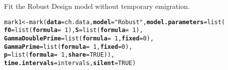 \documentclass[color=usenames,dvipsnames]{beamer}\usepackage[]{graphicx}\usepackage[]{xcolor}
\makeatletter
\newcommand{\hlnum}[1]{\textcolor[rgb]{0.69,0.494,0}{#1}}%
\newcommand{\hlsng}[1]{\textcolor[rgb]{0.749,0.012,0.012}{#1}}%
\newcommand{\hlopt}[1]{\textcolor[rgb]{0,0,0}{#1}}%
\newcommand{\hldef}[1]{\textcolor[rgb]{0,0,0}{#1}}%
\newcommand{\hlkwb}[1]{\textcolor[rgb]{0,0.341,0.682}{#1}}%
\newcommand{\hlkwc}[1]{\textcolor[rgb]{0,0,0}{\textbf{#1}}}%
\newcommand{\hlkwd}[1]{\textcolor[rgb]{0.004,0.004,0.506}{#1}}%
\newenvironment{kframe}{%
 \def\at@end@of@kframe{}%
 \ifinner\ifhmode%
  \def\at@end@of@kframe{\end{minipage}}%
  \begin{minipage}{\columnwidth}%
 \fi\fi%
 \def\FrameCommand##1{\hskip\@totalleftmargin \hskip-\fboxsep
 \colorbox{shadecolor}{##1}\hskip-\fboxsep
     \hskip-\linewidth \hskip-\@totalleftmargin \hskip\columnwidth}%
 \MakeFramed {\advance\hsize-\width
   \@totalleftmargin\z@ \linewidth\hsize
   \@setminipage}}%
 {\par\unskip\endMakeFramed%
 \at@end@of@kframe}
\newenvironment{knitrout}{}{} %
\makeatother
\begin{document}
\begin{frame}[fragile]
  \pause
  \vfill
  Fit the Robust Design model without temporary emigration. 
\begin{knitrout}\scriptsize
{}\color{fgcolor}\begin{kframe}
\begin{alltt}
\hldef{mark1} \hlkwb{<-} \hlkwd{mark}\hldef{(}\hlkwc{data}\hldef{=ch.data,} \hlkwc{model}\hldef{=}\hlsng{"Robust"}\hldef{,} \hlkwc{model.parameters}\hldef{=}\hlkwd{list}\hldef{(}
                \hlkwc{f0}\hldef{=}\hlkwd{list}\hldef{(}\hlkwc{formula}\hldef{=}\hlopt{~}\hlnum{1}\hldef{),} \hlkwc{S}\hldef{=}\hlkwd{list}\hldef{(}\hlkwc{formula}\hldef{=}\hlopt{~}\hlnum{1}\hldef{),}
                \hlkwc{GammaDoublePrime}\hldef{=}\hlkwd{list}\hldef{(}\hlkwc{formula}\hldef{=}\hlopt{~}\hlnum{1}\hldef{,} \hlkwc{fixed}\hldef{=}\hlnum{0}\hldef{),}
                \hlkwc{GammaPrime}\hldef{=}\hlkwd{list}\hldef{(}\hlkwc{formula}\hldef{=}\hlopt{~}\hlnum{1}\hldef{,} \hlkwc{fixed}\hldef{=}\hlnum{0}\hldef{),}
                \hlkwc{p}\hldef{=}\hlkwd{list}\hldef{(}\hlkwc{formula}\hldef{=}\hlopt{~}\hlnum{1}\hldef{,} \hlkwc{share}\hldef{=}\hlnum{TRUE}\hldef{)),}
              \hlkwc{time.intervals}\hldef{=intervals,} \hlkwc{silent}\hldef{=}\hlnum{TRUE}\hldef{)}
\end{alltt}
\end{kframe}
\end{knitrout}
\end{frame}
\end{document}

